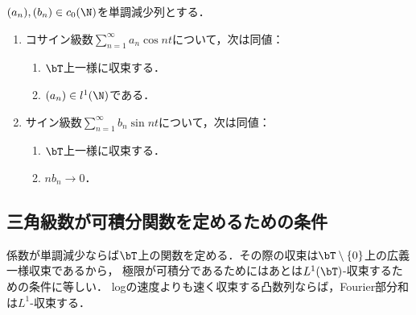 \documentclass[uplatex,dvipdfmx]{jsreport}
\begin{document}
\begin{proposition}
    $(a_n),(b_n)\in c_0(\N)$を単調減少列とする．
    \begin{enumerate}
        \item コサイン級数$\sum_{n=1}^\infty a_n\cos nt$について，次は同値：
        \begin{enumerate}
            \item $\bT$上一様に収束する．
            \item $(a_n)\in l^1(\N)$である．
        \end{enumerate}
        \item サイン級数$\sum_{n=1}^\infty b_n\sin nt$について，次は同値：
        \begin{enumerate}
            \item $\bT$上一様に収束する．
            \item $nb_n\to0$．
        \end{enumerate}
    \end{enumerate}
\end{proposition}

\subsection{三角級数が可積分関数を定めるための条件}

\begin{tcolorbox}[colframe=ForestGreen, colback=ForestGreen!10!white,breakable,colbacktitle=ForestGreen!40!white,coltitle=black,fonttitle=\bfseries\sffamily,
title=]
    係数が単調減少ならば$\bT$上の関数を定める．その際の収束は$\bT\setminus\{0\}$上の広義一様収束であるから，
    極限が可積分であるためにはあとは$L^1(\bT)$-収束するための条件に等しい．
    logの速度よりも速く収束する凸数列ならば，Fourier部分和は$L^1$-収束する．
\end{tcolorbox}
\end{document}
